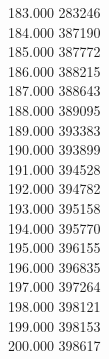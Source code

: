 { 183.000	283246 \\
 184.000	387190 \\
 185.000	387772 \\
 186.000	388215 \\
 187.000	388643 \\
 188.000	389095 \\
 189.000	393383 \\
 190.000	393899 \\
 191.000	394528 \\
 192.000	394782 \\
 193.000	395158 \\
 194.000	395770 \\
 195.000	396155 \\
 196.000	396835 \\
 197.000	397264 \\
 198.000	398121 \\
 199.000	398153 \\
 200.000	398617 \\
}
